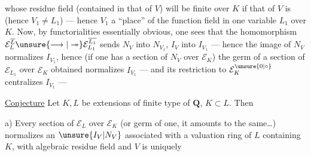 whose residue field (contained in that of
$V$) will be  finite over $K$ if that of $V$
is (hence $V_1\ne L_1$) --- hence $V_1$ \deleted{$\longrightarrow$}  a
``place'' of the function field in one variable
$L_1$ over $K$. Now, by functorialities
essentially obvious, one sees that
the homomorphism $\mathcal E_L^{\overline L}\unsure{\longrightarrow|\twoheadrightarrow}\mathcal E_{L_1}^{\overline{L_1}}$ sends $N_V$ into $N_{V_1}$,
$I_V$ into $I_{V_1}$ --- hence the image of $N_V$
normalizes $I_{V_1}$, hence (if one has a  section
of $N_V$ over $\mathcal E_K$) the germ of a section
of $\mathcal E_{L_1}$ over $\mathcal E_K$ obtained normalizes $I_{V_1}$
--- and its restriction to $\mathcal E_K^{\unsure{0|\circ}}$ centralizes
$I_{V_1}$ ---

\uline{Conjecture} Let $K,L$ be extensions of
finite type of $\mathbf Q$, $K\subset L$. Then

a) Every section of $\mathcal E_L$ over $\mathcal E_K$
(or germ of one, it amounts to the same\ldots)
normalizes an $\unsure{I_V|N_V}$ associated with a valuation
ring  of $L$ containing $K$, with
algebraic residue field  \deleted{\unsure{,}} and  $V$ is uniquely

